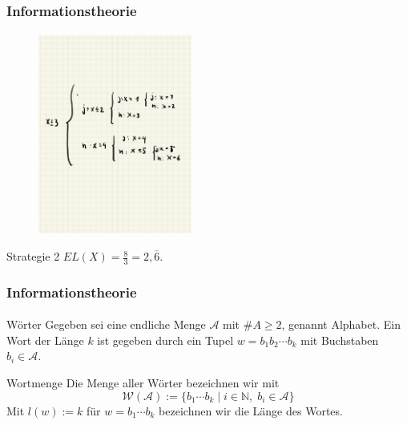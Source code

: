 \documentclass{beamer}
\begin{document}
\begin{frame}
    \frametitle{Informationstheorie}
\framesubtitle{}
\begin{figure}[htp]
      \centering
    \includegraphics[width=0.45\textwidth]{img/strategie2}
\end{figure}

\begin{block}{Strategie 2}
 $EL(X) = \frac{8}{3} = 2,\overline{6}$.
\end{block}

 \end{frame}

\begin{frame}
    \frametitle{Informationstheorie}
\framesubtitle{}

\begin{block}{Wörter}
Gegeben sei eine endliche Menge $\mathcal{A}$ mit $\# A \geq 2$, genannt Alphabet.
Ein Wort der Länge $k$ ist gegeben durch ein Tupel $w = b_1b_2 \cdots b_k$ mit Buchstaben $b_i \in \mathcal {A}$.
\end{block}

\begin{block}{Wortmenge}
Die Menge aller Wörter bezeichnen wir mit 
$$\mathcal{W} (\mathcal{A}) := \{  b_1 \cdots b_k \; | \; i \in \mathbb{N}, \; b_i \in \mathcal{A} \} $$
 Mit $l(w):= k$ für $w=b_1 \cdots b_k  $ bezeichnen wir die Länge des Wortes.
\end{block}

 \end{frame}
\end{document}
